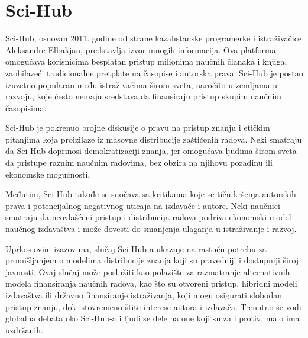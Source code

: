 \documentclass[a4paper]{article}
\begin{document}
{\setlength{\parskip}{1em}


\section{Sci-Hub}	
\label{sec:sci-hub}

Sci-Hub, osnovan 2011. godine od strane kazahstanske programerke i istraživačice Aleksandre Elbakjan, predstavlja izvor mnogih informacija. Ova platforma omogućava korisnicima besplatan pristup milionima naučnih članaka i knjiga, zaobilazeći tradicionalne pretplate na časopise i autorska prava. Sci-Hub je postao izuzetno popularan među istraživačima širom sveta, naročito u zemljama u razvoju, koje često nemaju sredstava da finansiraju pristup skupim naučnim časopisima.

Sci-Hub je pokrenuo brojne diskusije o pravu na pristup znanju i etičkim pitanjima koja proizilaze iz masovne distribucije zaštićenih radova. Neki smatraju da Sci-Hub doprinosi demokratizaciji znanja, jer omogućava ljudima širom sveta da pristupe raznim naučnim radovima, bez obzira na njihovu pozadinu ili ekonomske mogućnosti.

Međutim, Sci-Hub takođe se suočava sa kritikama koje se tiču kršenja autorskih prava i potencijalnog negativnog uticaja na izdavače i autore. Neki naučnici smatraju da neovlašćeni pristup i distribucija radova podriva ekonomski model naučnog izdavaštva i može dovesti do smanjenja ulaganja u istraživanje i razvoj.

Uprkos ovim izazovima, slučaj Sci-Hub-a ukazuje na rastuću potrebu za promišljanjem o modelima distribucije znanja koji su pravedniji i dostupniji široj javnosti. Ovaj slučaj može poslužiti kao polazište za razmatranje alternativnih modela finansiranja naučnih radova, kao što su otvoreni pristup, hibridni modeli izdavaštva ili državno finansiranje istraživanja, koji mogu osigurati slobodan pristup znanju, dok istovremeno štite interese autora i izdavača. Trenutno se vodi globalna debata oko Sci-Hub-a i ljudi se dele na one koji su za i protiv, malo ima uzdržanih.

\setlength{\parskip}{2em}


\begin{verbatim}

\end{verbatim}

}
\end{document}
